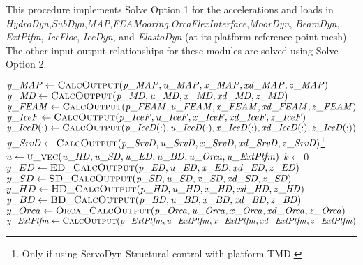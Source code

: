\documentclass[10pt,letterpaper,oneside,notitlepage]{article}
\begin{document}
This procedure implements Solve Option 1 for the accelerations and loads in
\emph{HydroDyn},\emph{SubDyn},\emph{MAP},\emph{FEAMooring},\emph{OrcaFlexInterface},\emph{MoorDyn}, \emph{BeamDyn}, \emph{ExtPtfm}, \emph{IceFloe}, \emph{IceDyn}, and \emph{ElastoDyn} (at its platform reference point mesh). 
The other input-output relationships for these modules are solved using Solve Option 2.

\begin{algorithmic}[1]

   \State
   \State $\mathit{y\_MAP}     \gets \Call{CalcOutput}{\mathit{p\_MAP},\mathit{u\_MAP},\mathit{x\_MAP},\mathit{xd\_MAP},\mathit{z\_MAP}}$ 
   \State $\mathit{y\_MD}      \gets \Call{CalcOutput}{\mathit{p\_MD},\mathit{u\_MD},\mathit{x\_MD},\mathit{xd\_MD},\mathit{z\_MD}}$
   \State $\mathit{y\_FEAM}    \gets \Call{CalcOutput}{\mathit{p\_FEAM},\mathit{u\_FEAM},\mathit{x\_FEAM},\mathit{xd\_FEAM},\mathit{z\_FEAM}}$
   \State $\mathit{y\_IceF}    \gets \Call{CalcOutput}{\mathit{p\_IceF},\mathit{u\_IceF},\mathit{x\_IceF},\mathit{xd\_IceF},\mathit{z\_IceF}}$
   \State $\mathit{y\_IceD(:)} \gets \Call{CalcOutput}{\mathit{p\_IceD(:)},\mathit{u\_IceD(:)},\mathit{x\_IceD(:)},\mathit{xd\_IceD(:)},\mathit{z\_IceD(:)}}$
   \State $\mathit{y\_SrvD}    \gets \Call{CalcOutput}{\mathit{p\_SrvD},\mathit{u\_SrvD},\mathit{x\_SrvD},\mathit{xd\_SrvD},\mathit{z\_SrvD}}$\footnote{Only if using ServoDyn Structural control with platform TMD.}
   \State
   \State{}
   \State
   \State $u \gets \Call{u\_vec}{\mathit{u\_HD},\mathit{u\_SD},\mathit{u\_ED},\mathit{u\_BD},\mathit{u\_Orca},\mathit{u\_ExtPtfm}}$
   \State $k \gets 0$
   \Loop{}
      \State $y\_ED   \gets \Call{ED\_CalcOutput}{\mathit{p\_ED},\mathit{u\_ED},\mathit{x\_ED},\mathit{xd\_ED},\mathit{z\_ED}}$
      \State $y\_SD   \gets \Call{SD\_CalcOutput}{\mathit{p\_SD},\mathit{u\_SD},\mathit{x\_SD},\mathit{xd\_SD},\mathit{z\_SD}}$
      \State $y\_HD   \gets \Call{HD\_CalcOutput}{\mathit{p\_HD},\mathit{u\_HD},\mathit{x\_HD},\mathit{xd\_HD},\mathit{z\_HD}}$
      \State $y\_BD   \gets \Call{BD\_CalcOutput}{\mathit{p\_BD},\mathit{u\_BD},\mathit{x\_BD},\mathit{xd\_BD},\mathit{z\_BD}}$
      \State $y\_Orca \gets \Call{Orca\_CalcOutput}{\mathit{p\_Orca},\mathit{u\_Orca},\mathit{x\_Orca},\mathit{xd\_Orca},\mathit{z\_Orca}}$
      \State $\mathit{y\_ExtPtfm}     \gets \Call{CalcOutput}{\mathit{p\_ExtPtfm},\mathit{u\_ExtPtfm},\mathit{x\_ExtPtfm},\mathit{xd\_ExtPtfm},\mathit{z\_ExtPtfm}}$ 
   

\end{algorithmic}
\end{document}
